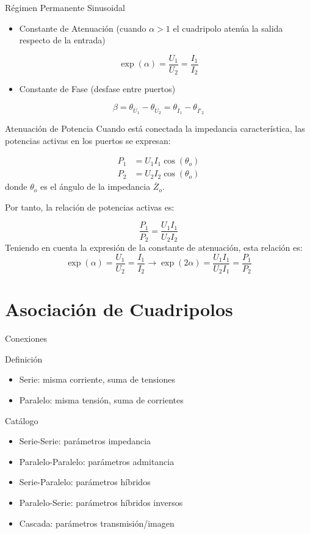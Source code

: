 \documentclass[aspectratio=169, usenames,svgnames,dvipsnames]{beamer}
\begin{document}
\begin{frame}[label={sec:org779a601}]{Régimen Permanente Sinusoidal}
\begin{itemize}
\item \alert{Constante de Atenuación} (cuando \(\alpha > 1\) el cuadripolo atenúa la salida respecto de la entrada)
\end{itemize}
\[
  \exp(\alpha) = \frac{U_1}{U_2} = \frac{I_1}{I_2}
\]
\begin{itemize}
\item \alert{Constante de Fase} (desfase entre puertos)
\end{itemize}
\[
  \beta = \theta_{\overline{U}_1} - \theta_{\overline{U}_2} = \theta_{\overline{I}_1} - \theta_{\overline{I}'_2}
\]
\end{frame}

\begin{frame}[label={sec:orgab7d184}]{Atenuación de Potencia}
\alert{Cuando está conectada la impedancia característica}, las potencias activas en los puertos se expresan:

\begin{align*}
  P_1 &= U_1 I_1 \cos(\theta_o)\\
  P_2 &= U_2 I_2 \cos(\theta_o)
\end{align*}
donde \(\theta_o\) es el ángulo de la impedancia \(\overline{Z}_o\).

Por tanto, la relación de potencias activas es:

\[
\frac{P_1}{P_2} = \frac{U_1 I_1}{U_2 I_2}
\]
Teniendo en cuenta la expresión de la constante de atenuación, esta relación es:
\[
    \exp(\alpha) = \frac{U_1}{U_2} = \frac{I_1}{I_2} \rightarrow \boxed{\exp(2\alpha) = \frac{U_1 I_1}{U_2 I_1} = \frac{P_1}{P_2}}
\]
\end{frame}

\section{Asociación de Cuadripolos}
\label{sec:org96cf549}

\begin{frame}[label={sec:org8ceb248}]{Conexiones}
\begin{block}{Definición}
\begin{itemize}
\item \alert{Serie}: misma corriente, suma de tensiones
\item \alert{Paralelo}: misma tensión, suma de corrientes
\end{itemize}
\end{block}
\begin{block}{Catálogo}
\begin{itemize}
\item Serie-Serie: \alert{parámetros impedancia}
\item Paralelo-Paralelo: \alert{parámetros admitancia}
\item Serie-Paralelo: \alert{parámetros híbridos}
\item Paralelo-Serie: \alert{parámetros híbridos inversos}
\item Cascada: \alert{parámetros transmisión/imagen}
\end{itemize}
\end{block}
\end{frame}
\end{document}
